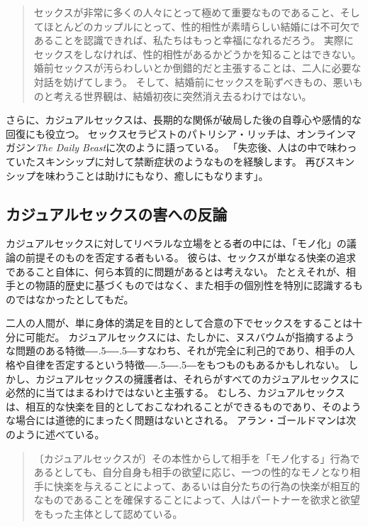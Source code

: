 \documentclass[paper=a4,book,openany]{jlreq}
\newcommand{\ig}[1]{}           %
\def\DDASH{―\kern-.5\zw―\kern-.5\zw―}
\begin{document}
\begin{quote}
  セックスが非常に多くの人々にとって極めて重要なものであること、そしてほとんどのカップルにとって、性的相性が素晴らしい結婚には不可欠であることを認識できれば、私たちはもっと幸福になれるだろう。
実際にセックスをしなければ、性的相性があるかどうかを知ることはできない。
婚前セックスが汚らわしいとか倒錯的だと主張することは、二人に必要な対話を妨げてしまう。
そして、結婚前にセックスを恥ずべきもの、悪いものと考える世界観は、結婚初夜に突然消え去るわけではない。
\citep{filipovic12:_moral_case_sex_marr}
\end{quote}

さらに、カジュアルセックスは、長期的な関係が破局した後の自尊心や感情的な回復にも役立つ。
セックスセラピストのパトリシア・リッチは、オンラインマガジン\emph{The Daily Beast}に次のように語っている。
「失恋後、人はの中で味わっていたスキンシップに対して禁断症状のようなものを経験します。
再びスキンシップを味わうことは助けにもなり、癒しにもなります」\citep{shire14:_peop_who_have}。

\subsection{カジュアルセックスの害への反論}

カジュアルセックスに対してリベラルな立場をとる者の中には、「モノ化」の議論の前提そのものを否定する者もいる。
彼らは、セックスが単なる快楽の追求であること自体に、何ら本質的に問題があるとは考えない。
たとえそれが、相手との物語的歴史に基づくものではなく、また相手の個別性を特別に認識するものではなかったとしてもだ。

二人の人間が、単に身体的満足を目的として合意の下でセックスをすることは十分に可能だ。
カジュアルセックスには、たしかに、ヌスバウムが指摘するような問題のある特徴{\DDASH}すなわち、それが完全に利己的であり、相手の人格や自律を否定するという特徴{\DDASH}をもつものもあるかもしれない。
しかし、カジュアルセックスの擁護者は、それらがすべてのカジュアルセックスに必然的に当てはまるわけではないと主張する。
むしろ、カジュアルセックスは、相互的な快楽を目的としておこなわれることができるものであり、そのような場合には道徳的にまったく問題はないとされる。
アラン・ゴールドマンは次のように述べている。

\begin{quote}
〔カジュアルセックスが〕その本性からして相手を「モノ化する」行為であるとしても、自分自身も相手の欲望に応じ、一つの性的なモノとなり相手に快楽を与えることによって、あるいは自分たちの行為の快楽が相互的なものであることを確保することによって、人はパートナーを欲求と欲望をもった主体として認めている。
\citep[p. 283]{goldman77:_plain_sex}\ig{Alan Goldman}
\end{quote}
\end{document}
